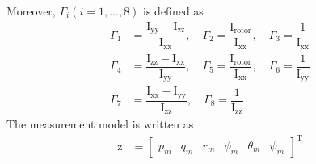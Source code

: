 \documentclass[3p,times]{elsarticle}
\begin{document}
Moreover, $\Gamma_i(i=1, ..., 8)$ is defined as
\begin{equation}
	\begin{split}
		\Gamma_1 &= \dfrac{\mathrm{I}_{\text{yy}} - \mathrm{I}_{\text{zz}}}{\mathrm{I}_{\text{xx}}}, \quad \Gamma_2 = \dfrac{\mathrm{I}_{\text{rotor}}}{\mathrm{I}_{\text{xx}}}, \quad \Gamma_3 = \dfrac{1}{\mathrm{I}_{\text{xx}}}\\ \Gamma_4 &= \dfrac{\mathrm{I}_{\text{zz}} - \mathrm{I}_{\text{xx}}}{\mathrm{I}_{\text{yy}}}, \quad \Gamma_5 = \dfrac{\mathrm{I}_{\text{rotor}}}{\mathrm{I}_{\text{xx}}}, \quad \Gamma_6 = \dfrac{1}{\mathrm{I}_{\text{yy}}} \\ \Gamma_7 &= \dfrac{\mathrm{I}_{\text{xx}} - \mathrm{I}_{\text{yy}}}{\mathrm{I}_{\text{zz}}}, \quad \Gamma_8 = \dfrac{1}{\mathrm{I}_{\text{zz}}}
	\end{split}
\end{equation}
The measurement model is written as
\begin{equation}
	\begin{split}
		\boldsymbol{\mathrm{z}} &= \begin{bmatrix}
			p_m & q_m & r_m & \phi_m & \theta_m & \psi_m
		\end{bmatrix}^\mathrm{T}
	\end{split}
\end{equation}
\end{document}
